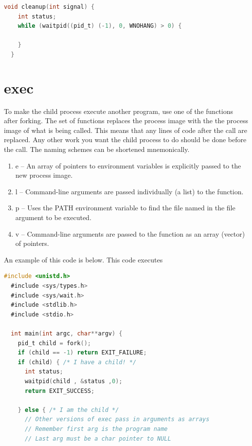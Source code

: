\begin{itemize}
\begin{itemize}
\begin{lstlisting}[language=C]
  void cleanup(int signal) {
    int status;
    while (waitpid((pid_t) (-1), 0, WNOHANG) > 0) {

    }
  }
\end{lstlisting}

\section{exec}

To make the child process execute another program, use one of the \href{http://man7.org/linux/man-pages/man3/exec.3.html}{} functions after forking.
The  set of functions replaces the process image with the the process image of what is being called.
This means that any lines of code after the  call are replaced.
Any other work you want the child process to do should be done before the  call.
The naming schemes can be shortened mnemonically.

\begin{enumerate}
\item e -- An array of pointers to environment variables is explicitly passed to the new process image.
\item l -- Command-line arguments are passed individually (a list) to the function.
\item p -- Uses the PATH environment variable to find the file named in the file argument to be executed.
\item v -- Command-line arguments are passed to the function as an array (vector) of pointers.
\end{enumerate}

An example of this code is below. This code executes 

\begin{lstlisting}[language=C]
  #include <unistd.h>
  #include <sys/types.h>
  #include <sys/wait.h>
  #include <stdlib.h>
  #include <stdio.h>

  int main(int argc, char**argv) {
    pid_t child = fork();
    if (child == -1) return EXIT_FAILURE;
    if (child) { /* I have a child! */
      int status;
      waitpid(child , &status ,0);
      return EXIT_SUCCESS;

    } else { /* I am the child */
      // Other versions of exec pass in arguments as arrays
      // Remember first arg is the program name
      // Last arg must be a char pointer to NULL


\end{lstlisting}
\end{itemize}
\end{itemize}

